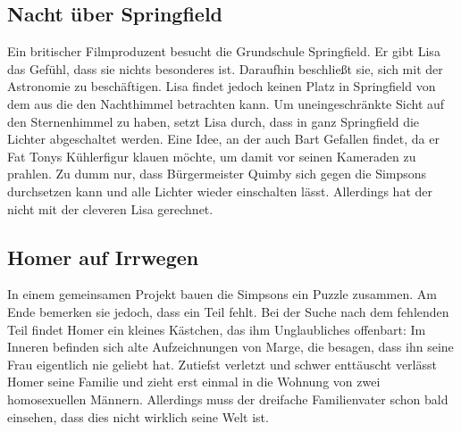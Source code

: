 
\subsection{Nacht über Springfield}\label{EABF11}
Ein britischer Filmproduzent besucht die Grundschule Springfield. Er gibt Lisa das Gefühl, dass sie nichts besonderes ist. Daraufhin beschließt sie, sich mit der Astronomie zu beschäftigen. Lisa findet jedoch keinen Platz in Springfield von dem aus die den Nachthimmel betrachten kann. Um uneingeschränkte Sicht auf den Sternenhimmel zu haben, setzt Lisa durch, dass in ganz Springfield die Lichter abgeschaltet werden. Eine Idee, an der auch Bart Gefallen findet, da er Fat Tonys Kühlerfigur klauen möchte, um damit vor seinen Kameraden zu prahlen. Zu dumm nur, dass Bürgermeister Quimby sich gegen die Simpsons durchsetzen kann und alle Lichter wieder einschalten lässt. Allerdings hat der nicht mit der cleveren Lisa gerechnet.


\subsection{Homer auf Irrwegen}
In einem gemeinsamen Projekt bauen die Simpsons ein Puzzle zusammen. Am Ende bemerken sie jedoch, dass ein Teil fehlt. Bei der Suche nach dem fehlenden Teil findet Homer ein kleines Kästchen, das ihm Unglaubliches offenbart: Im Inneren befinden sich alte Aufzeichnungen von Marge, die besagen, dass ihn seine Frau eigentlich nie geliebt hat. Zutiefst verletzt und schwer enttäuscht verlässt Homer seine Familie und zieht erst einmal in die Wohnung von zwei homosexuellen Männern. Allerdings muss der dreifache Familienvater schon bald einsehen, dass dies nicht wirklich seine Welt ist.

